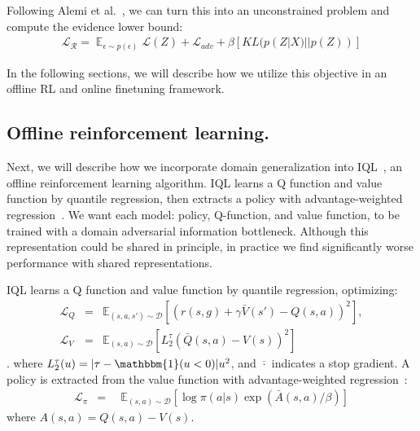 \documentclass[letterpaper, 10 pt, conference, final]{ieeeconf}   %
\DeclareMathOperator{\E}{\mathbb{E}}
\begin{document}
Following Alemi et al.~\cite{alemi2017vib}, we can turn this into an unconstrained problem and compute the evidence lower bound:
\begin{eqnarray}
\mathcal{L_R} = \E_{\epsilon \sim p(\epsilon)} \mathcal{L}(Z) + \mathcal{L}_{adv} + \beta[KL(p(Z|X)||p(Z))] 
\end{eqnarray}

In the following sections, we will describe how we utilize this objective in an offline RL and online finetuning framework.


\subsection{Offline reinforcement learning.}

Next, we will describe how we incorporate domain generalization into IQL~\cite{kostrikov2021iql}, an offline reinforcement learning algorithm.
IQL learns a Q function and value function by quantile regression, then extracts a policy with advantage-weighted regression~\cite{peng2019awr}.
We want each model: policy, Q-function, and value function, to be trained with a domain adversarial information bottleneck. Although this representation could be shared in principle, in practice we find significantly worse performance with shared representations.

IQL learns a Q function and value function by quantile regression, optimizing:
\begin{eqnarray}
    \mathcal{L}_{Q} &=&  \mathbb{E}_{(s, a, s') \sim \mathcal{D}} \left[(r(s, g) + \gamma \bar{V}(s') - Q(s, a))^2 \right],  \\
    \mathcal{L}_{V} &=& \mathbb{E}_{(s, a) \sim \mathcal{D}} \left[L_2^\tau(\bar{Q}(s, a) - V(s))^2 \right] 
\end{eqnarray}.
where $L_2^\tau(u) = |\tau-\mathbbm{1}(u < 0)|u^2$, and $\overline{\cdot}$ indicates a stop gradient. A policy is extracted from the value function with advantage-weighted regression~\cite{peng2019awr}:
\begin{eqnarray}
    \mathcal{L}_{\pi} &=& 
    \enspace 
    \mathbb{E}_{(s, a) \sim \mathcal{D}} \left[\log \pi(a|s) \exp(\bar{A}(s, a)/\beta) \right]
\end{eqnarray}
where $A(s, a) = Q(s, a) - V(s)$.
\end{document}
